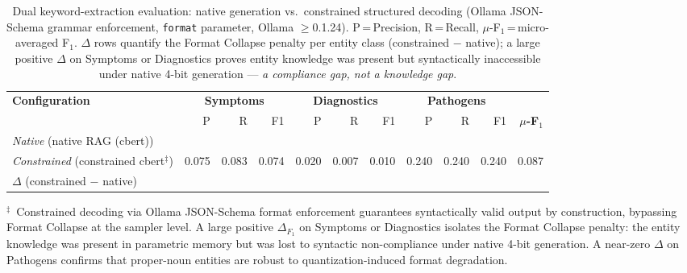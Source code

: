 
\begin{table}[t]
\centering
\caption{%
  Dual keyword-extraction evaluation: native generation vs.\ constrained
  structured decoding (Ollama JSON-Schema grammar enforcement,
  \texttt{format} parameter, Ollama $\geq$0.1.24).
  P\,=\,Precision, R\,=\,Recall, $\mu$-F$_1$\,=\,micro-averaged F$_1$.
  $\Delta$ rows quantify the Format Collapse penalty per entity class
  (constrained $-$ native); a large positive $\Delta$ on Symptoms or
  Diagnostics proves entity knowledge was present but syntactically
  inaccessible under native 4-bit generation --- \emph{a compliance gap,
  not a knowledge gap}.
}
\label{tab:keywords_constrained}
\setlength{\tabcolsep}{3pt}
\begin{tabular}{@{}lrrr rrr rrr r@{}}
\toprule
\textbf{Configuration} &
  \multicolumn{3}{c}{\textbf{Symptoms}} &
  \multicolumn{3}{c}{\textbf{Diagnostics}} &
  \multicolumn{3}{c}{\textbf{Pathogens}} & \\
 & P & R & F1 & P & R & F1 & P & R & F1 & \textbf{$\mu$-F$_1$} \\
\midrule
\textit{Native} (native RAG (cbert)) & \PH{} & \PH{} & \PH{} & \PH{} & \PH{} & \PH{} & \PH{} & \PH{} & \PH{} & \PH{} \\
\textit{Constrained} (constrained cbert$^\ddagger$) & 0.075 & 0.083 & 0.074 & 0.020 & 0.007 & 0.010 & 0.240 & 0.240 & 0.240 & 0.087 \\
\midrule
$\Delta$ (constrained $-$ native) & \PH{} & \PH{} & \PH{} & \PH{} & \PH{} & \PH{} & \PH{} & \PH{} & \PH{} & \PH{} \\
\bottomrule
\end{tabular}
\vspace{4pt}
\begin{minipage}{\linewidth}
\footnotesize
$^\ddagger$~Constrained decoding via Ollama JSON-Schema format enforcement
guarantees syntactically valid output by construction, bypassing Format Collapse
at the sampler level.  A large positive $\Delta_{F_1}$ on Symptoms or
Diagnostics isolates the Format Collapse penalty: the entity knowledge was present
in parametric memory but was lost to syntactic non-compliance under native 4-bit
generation.  A near-zero $\Delta$ on Pathogens confirms that proper-noun entities
are robust to quantization-induced format degradation.
\end{minipage}
\end{table}
